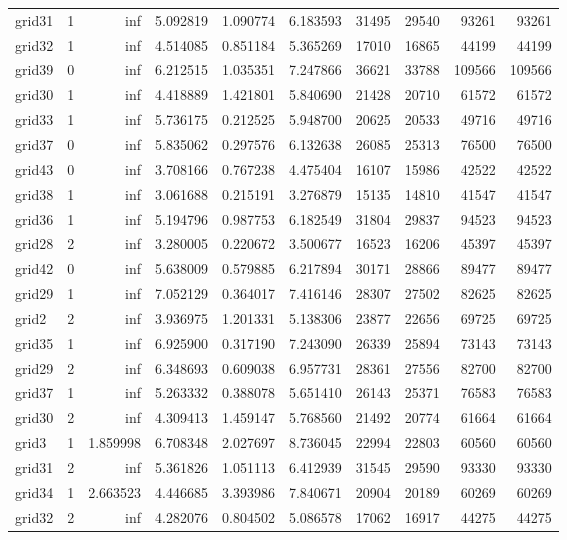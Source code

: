 \begin{longtable}{|l|r|r|r|r|r|r|r|r|r|}
grid31 & 1 & inf & 5.092819 & 1.090774 & 6.183593 & 31495 & 29540 & 93261 & 93261 \\
grid32 & 1 & inf & 4.514085 & 0.851184 & 5.365269 & 17010 & 16865 & 44199 & 44199 \\
grid39 & 0 & inf & 6.212515 & 1.035351 & 7.247866 & 36621 & 33788 & 109566 & 109566 \\
grid30 & 1 & inf & 4.418889 & 1.421801 & 5.840690 & 21428 & 20710 & 61572 & 61572 \\
grid33 & 1 & inf & 5.736175 & 0.212525 & 5.948700 & 20625 & 20533 & 49716 & 49716 \\
grid37 & 0 & inf & 5.835062 & 0.297576 & 6.132638 & 26085 & 25313 & 76500 & 76500 \\
grid43 & 0 & inf & 3.708166 & 0.767238 & 4.475404 & 16107 & 15986 & 42522 & 42522 \\
grid38 & 1 & inf & 3.061688 & 0.215191 & 3.276879 & 15135 & 14810 & 41547 & 41547 \\
grid36 & 1 & inf & 5.194796 & 0.987753 & 6.182549 & 31804 & 29837 & 94523 & 94523 \\
grid28 & 2 & inf & 3.280005 & 0.220672 & 3.500677 & 16523 & 16206 & 45397 & 45397 \\
grid42 & 0 & inf & 5.638009 & 0.579885 & 6.217894 & 30171 & 28866 & 89477 & 89477 \\
grid29 & 1 & inf & 7.052129 & 0.364017 & 7.416146 & 28307 & 27502 & 82625 & 82625 \\
grid2 & 2 & inf & 3.936975 & 1.201331 & 5.138306 & 23877 & 22656 & 69725 & 69725 \\
grid35 & 1 & inf & 6.925900 & 0.317190 & 7.243090 & 26339 & 25894 & 73143 & 73143 \\
grid29 & 2 & inf & 6.348693 & 0.609038 & 6.957731 & 28361 & 27556 & 82700 & 82700 \\
grid37 & 1 & inf & 5.263332 & 0.388078 & 5.651410 & 26143 & 25371 & 76583 & 76583 \\
grid30 & 2 & inf & 4.309413 & 1.459147 & 5.768560 & 21492 & 20774 & 61664 & 61664 \\
grid3 & 1 & 1.859998 & 6.708348 & 2.027697 & 8.736045 & 22994 & 22803 & 60560 & 60560 \\
grid31 & 2 & inf & 5.361826 & 1.051113 & 6.412939 & 31545 & 29590 & 93330 & 93330 \\
grid34 & 1 & 2.663523 & 4.446685 & 3.393986 & 7.840671 & 20904 & 20189 & 60269 & 60269 \\
grid32 & 2 & inf & 4.282076 & 0.804502 & 5.086578 & 17062 & 16917 & 44275 & 44275 \\

\end{longtable}
